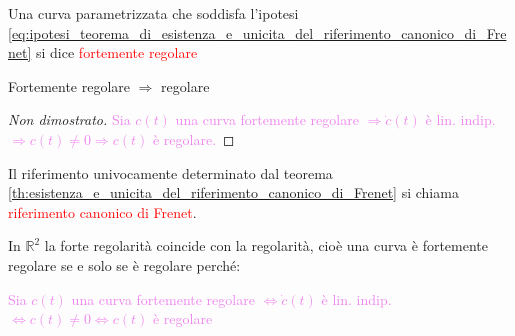         \begin{definizione}
        Una curva parametrizzata che soddisfa l'ipotesi \eqref{eq:ipotesi_teorema_di_esistenza_e_unicita_del_riferimento_canonico_di_Frenet} si dice \textcolor{red}{
        fortemente regolare}
        \end{definizione}
        \begin{osservazione}
        Fortemente regolare $\Rightarrow$ regolare
        \end{osservazione}
        \begin{proof}[Non dimostrato]
        \mbox{}

        \textcolor{violet}{Sia $c(t)$ una curva fortemente regolare $\Rightarrow \dot{c}(t)$ è lin. indip. $\Rightarrow c(t) \neq 0 \Rightarrow c(t)$ è regolare.}
        \end{proof}
        \begin{definizione}
        Il riferimento univocamente determinato dal teorema \ref{th:esistenza_e_unicita_del_riferimento_canonico_di_Frenet} si chiama \textcolor{red}{riferimento canonico di Frenet}.
        \end{definizione}
        \begin{osservazione}
        In $\mathbb{R}^2$ la forte regolarità coincide con la regolarità, cioè una curva è fortemente regolare se e solo se è regolare perché:

        \textcolor{violet}{Sia $c(t)$ una curva fortemente regolare $\iff \dot{c}(t)$ è lin. indip. $\iff c(t) \neq 0 \iff c(t)$ è regolare}
        \end{osservazione}
        \newpage
